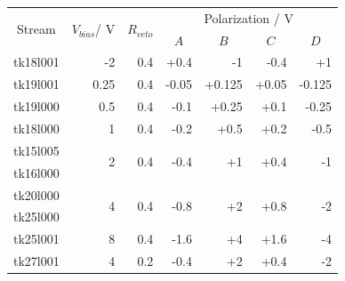\begin{table}[]
\centering
\begin{tabular}{c|rrrrrr}
\multicolumn{1}{c|}{\multirow{2}{*}{Stream}} &
  \multicolumn{1}{c|}{\multirow{2}{*}{$V_{bias}$/ V}} &
  \multicolumn{1}{c|}{\multirow{2}{*}{$R_{veto}$}} &
  \multicolumn{4}{c}{Polarization / V} \\ \cline{4-7} 
\multicolumn{1}{c|}{} &
  \multicolumn{1}{c|}{} &
  \multicolumn{1}{c|}{} &
  \multicolumn{1}{c|}{$A$} &
  \multicolumn{1}{c|}{$B$} &
  \multicolumn{1}{c|}{$C$} &
  \multicolumn{1}{c}{$D$} \\ \hline \hline
tk18l001					  & -2                 & 0.4                  & +0.4                  & -1                  & -0.4                  & +1                  \\ \hline
tk19l001                      & 0.25               & 0.4                  & -0.05                 & +0.125              & +0.05                 & -0.125              \\ \hline
tk19l000                      & 0.5                & 0.4                  & -0.1                  & +0.25               & +0.1                  & -0.25               \\ \hline
tk18l000                      & 1                  & 0.4                  & -0.2                  & +0.5                & +0.2                  & -0.5                \\ \hline
tk15l005                      & \multirow{2}{*}{2} & \multirow{2}{*}{0.4} & \multirow{2}{*}{-0.4} & \multirow{2}{*}{+1} & \multirow{2}{*}{+0.4} & \multirow{2}{*}{-1} \\
tk16l000                      &                    &                      &                       &                     &                       &                     \\ \hline
tk20l000                      & \multirow{2}{*}{4} & \multirow{2}{*}{0.4} & \multirow{2}{*}{-0.8} & \multirow{2}{*}{+2} & \multirow{2}{*}{+0.8} & \multirow{2}{*}{-2} \\
tk25l000                      &                    &                      &                       &                     &                       &                     \\ \hline
tk25l001  & 8                  & 0.4                  & -1.6                  & +4                  & +1.6                  & -4                  \\ \hline \hline
tk27l001                      & 4                  & 0.2                  & -0.4                  & +2                  & +0.4                  & -2                  \\ \hline

\end{tabular}
\end{table}
